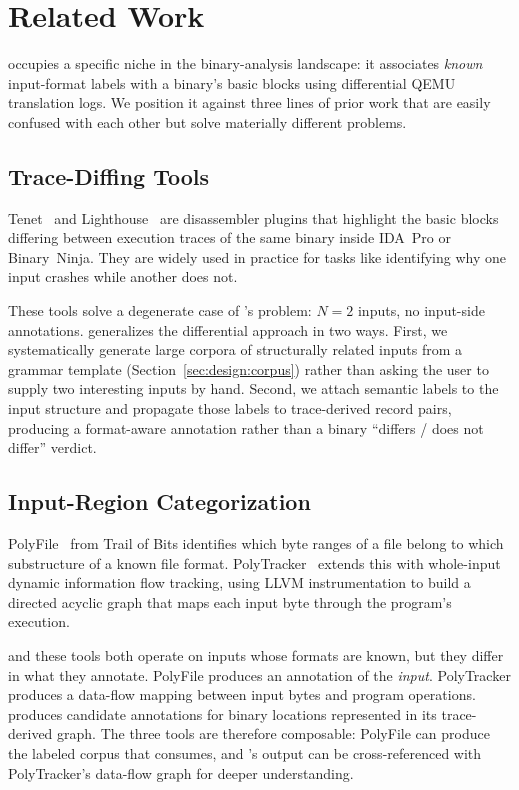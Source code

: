 \section{Related Work}\label{sec:rel}

\toolname occupies a specific niche in the binary-analysis landscape: it associates \textit{known} input-format labels with a binary's basic blocks using differential QEMU translation logs.
We position it against three lines of prior work that are easily confused with each other but solve materially different problems.

\subsection{Trace-Diffing Tools}\label{sec:rel:tenet}

Tenet~\cite{gaasedelen2021tenet} and Lighthouse~\cite{gaasedelen2017lighthouse} are disassembler plugins that highlight the basic blocks differing between execution traces of the same binary inside IDA~Pro or Binary~Ninja.
They are widely used in practice for tasks like identifying why one input crashes while another does not.

These tools solve a degenerate case of \toolname's problem: $N{=}2$ inputs, no input-side annotations.
\toolname generalizes the differential approach in two ways.
First, we systematically generate large corpora of structurally related inputs from a grammar template (Section~\ref{sec:design:corpus}) rather than asking the user to supply two interesting inputs by hand.
Second, we attach semantic labels to the input structure and propagate those labels to trace-derived record pairs, producing a format-aware annotation rather than a binary ``differs / does not differ'' verdict.

\subsection{Input-Region Categorization}\label{sec:rel:polyfile}

PolyFile~\cite{sultanik2019polyfile} from Trail of Bits identifies which byte ranges of a file belong to which substructure of a known file format.
PolyTracker~\cite{sultanik2024polytracker} extends this with whole-input dynamic information flow tracking, using LLVM instrumentation to build a directed acyclic graph that maps each input byte through the program's execution.

\toolname and these tools both operate on inputs whose formats are known, but they differ in what they annotate.
PolyFile produces an annotation of the \textit{input}.
PolyTracker produces a data-flow mapping between input bytes and program operations.
\toolname produces candidate annotations for binary locations represented in its trace-derived graph.
The three tools are therefore composable: PolyFile can produce the labeled corpus that \toolname consumes, and \toolname's output can be cross-referenced with PolyTracker's data-flow graph for deeper understanding.

